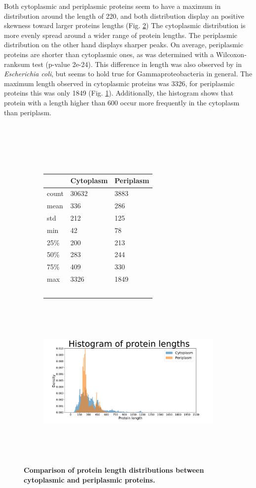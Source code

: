 Both cytoplasmic and periplasmic proteins seem to have a maximum in distribution around the length of 220,
and both distribution display an positive skewness toward larger proteins lengths (Fig. \ref{fig:protein_lengths_graph})
The cytoplasmic distribution is more evenly spread around a wider range of protein lengths.
The periplasmic distribution on the other hand displays sharper peaks.
On average, 
periplasmic proteins are shorter than cytoplasmic ones,
as was determined with a Wilcoxon-ranksum test (p-value 2e-24).
This difference in length was also observed by \cite{loos2019} in \textit{Escherichia coli},
but seems to hold true for Gammaproteobacteria in general.
The maximum length observed in cytoplasmic proteins was 3326,
for periplasmic proteins this was only 1849 (Fig. \ref{fig:protein_lengths_table}).
Additionally, the histogram shows that protein with a length higher than 600 occur more frequently in the cytoplasm than periplasm.

~\begin{figure}[h!]
	~\begin{subfigure}[b]{0.3\linewidth}
		~\begin{longtable}[]{@{}lll@{}}
			\toprule
			& Cytoplasm & Periplasm\tabularnewline
			\midrule
			\endhead
			count & 30632 & 3883\tabularnewline
			mean & 336 & 286\tabularnewline
			std & 212 & 125\tabularnewline
			min & 42 & 78\tabularnewline
			25\% & 200 & 213\tabularnewline
			50\% & 283 & 244\tabularnewline
			75\% & 409 & 330\tabularnewline
			max & 3326 & 1849\tabularnewline
			\bottomrule
		~\end{longtable}
		\caption{}
		\label{fig:protein_lengths_table}
	~\end{subfigure}
	\hfill
	~\begin{subfigure}[b]{0.68\linewidth}
		\includegraphics[width=\linewidth]
{./results/general_comparison/global_comparison/length/img/protein_lengths.pdf}
		\caption{}
		\label{fig:protein_lengths_graph}
	~\end{subfigure}
	\caption{
	\textbf{Comparison of protein length distributions between cytoplasmic and periplasmic proteins.}
	}
	\label{fig:protein_lengths}
~\end{figure}
